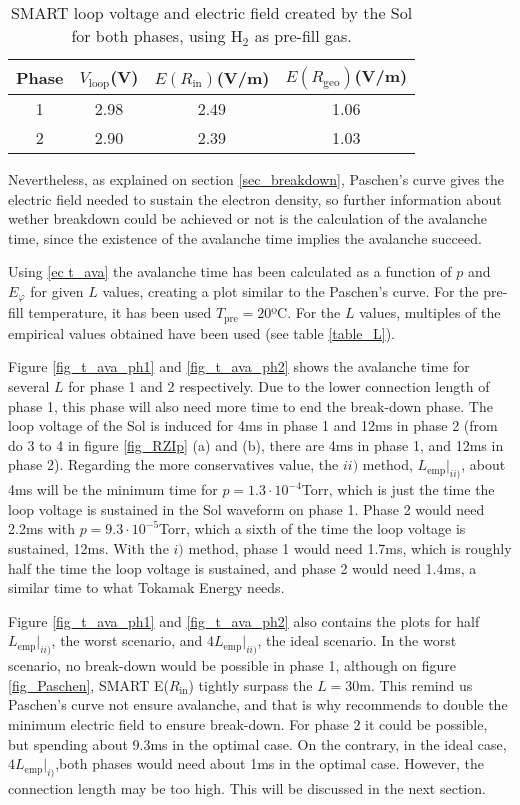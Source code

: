\documentclass[a4paper,12pt,oneside]{book}
\begin{document}
\begin{table}[htbp]
\centering
	\begin{tabular}{|c|c|c|c|} \hline
Phase	 & $V_\text{loop}$(V) & $E(R_\text{in})$(V/m) & $E(R_\text{geo})$(V/m) \\ \hline
	1 & 2.98 & 2.49 & 1.06 \\ \hline
	2 & 2.90 & 2.39 & 1.03 \\ \hline
	\end{tabular}
	\caption{SMART loop voltage and electric field created by the Sol for both phases, using H$_2$ as pre-fill gas.}
\label{table_Paschen_SMART}
\end{table}

Nevertheless, as explained on section \ref{sec_breakdown}, Paschen's curve gives the electric field needed to sustain the electron density, so further information about wether breakdown could be achieved or not is the calculation of the avalanche time, since the existence of the avalanche time implies the avalanche succeed. 

Using \eqref{ec t_ava} the avalanche time has been calculated as a function of $p$ and $E_\varphi$ for given $L$ values, creating a plot similar to the Paschen's curve. For the pre-fill temperature, it has been used $T_\text{pre}=20$ºC. For the $L$ values, multiples of the empirical values obtained have been used (see table \ref{table_L}).

Figure \ref{fig_t_ava_ph1} and \ref{fig_t_ava_ph2} shows the avalanche time for several $L$ for phase 1 and 2 respectively. Due to the lower connection length of phase 1, this phase will also need more time to end the break-down phase. The loop voltage of the Sol is induced for 4ms in phase 1 and 12ms in phase 2 (from do 3 to 4 in figure \ref{fig_RZIp} (a) and (b), there are 4ms in phase 1, and 12ms in phase 2). Regarding the more conservatives value, the $ii)$ method, $L_\text{emp}|_{ii)}$, about 4ms will be the minimum time for $p=1.3 \cdot 10^{-4}$Torr, which is just the time the  loop voltage is sustained in the Sol waveform on phase 1. Phase 2 would need 2.2ms with $p=9.3 \cdot 10^{-5}$Torr, which a sixth of the time the loop voltage is sustained, 12ms. With the $i)$ method, phase 1 would need 1.7ms, which is roughly half the time the loop voltage is sustained, and phase 2 would need 1.4ms, a similar time to what Tokamak Energy needs.

Figure \ref{fig_t_ava_ph1} and \ref{fig_t_ava_ph2} also contains the plots for half $L_\text{emp}|_{ii)}$, the worst scenario, and $4 L_\text{emp}|_{ii)}$, the ideal scenario. In the worst scenario, no break-down would be possible in phase 1, although on figure \ref{fig_Paschen}, SMART E($R_\text{in}$) tightly surpass the $L=30$m. This remind us Paschen's curve not ensure avalanche, and that is why \cite{ITER_2007} recommends to double the minimum electric field to ensure break-down. For phase 2 it could be possible, but spending about 9.3ms in the optimal case. On the contrary, in the ideal case, $4 L_\text{emp}|_{i)}$,both phases would need about 1ms in the optimal case. However, the connection length may be too high. This will be discussed in the next section.
\end{document}
